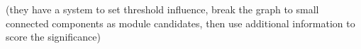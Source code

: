\documentclass[a4paper,10pt]{article}
\theoremstyle{definition}
\theoremstyle{remark}
\theoremstyle{plain}
\begin{document}
(they have a system to set threshold influence, break the graph to small 
connected components as module candidates, then use additional information 
to score the significance)

\end{document}
